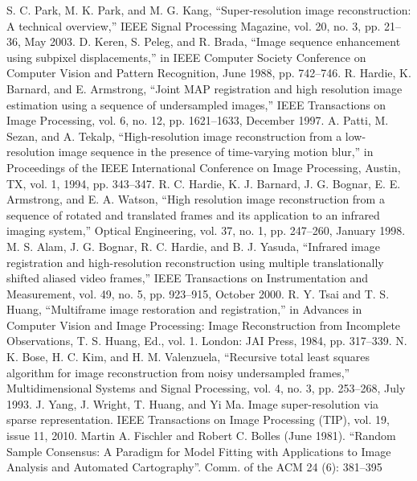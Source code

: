 
\begin{thebibliography}{99}

 S. C. Park, M. K. Park, and M. G. Kang, “Super-resolution image reconstruction:
A technical overview,” IEEE Signal Processing Magazine, vol. 20, no. 3, pp. 21–36,
May 2003.
 D. Keren, S. Peleg, and R. Brada, “Image sequence enhancement using subpixel
displacements,” in IEEE Computer Society Conference on Computer Vision and
Pattern Recognition, June 1988, pp. 742–746.
 R. Hardie, K. Barnard, and E. Armstrong, “Joint MAP registration and high resolution image estimation using a sequence of undersampled images,” IEEE Transactions on Image Processing, vol. 6, no. 12, pp. 1621–1633, December 1997.
 A. Patti, M. Sezan, and A. Tekalp, “High-resolution image reconstruction from
a low-resolution image sequence in the presence of time-varying motion blur,” in
Proceedings of the IEEE International Conference on Image Processing, Austin,
TX, vol. 1, 1994, pp. 343–347.
 R. C. Hardie, K. J. Barnard, J. G. Bognar, E. E. Armstrong, and E. A. Watson, “High resolution image reconstruction from a sequence of rotated and translated
frames and its application to an infrared imaging system,” Optical Engineering,
vol. 37, no. 1, pp. 247–260, January 1998.
 M. S. Alam, J. G. Bognar, R. C. Hardie, and B. J. Yasuda, “Infrared image registration and high-resolution reconstruction using multiple translationally shifted aliased video frames,” IEEE Transactions on Instrumentation and Measurement, vol. 49,
no. 5, pp. 923–915, October 2000.
 R. Y. Tsai and T. S. Huang, “Multiframe image restoration and registration,” in Advances in Computer Vision and Image Processing: Image Reconstruction from Incomplete Observations, T. S. Huang, Ed., vol. 1. London: JAI Press, 1984, pp. 317–339.
 N. K. Bose, H. C. Kim, and H. M. Valenzuela, “Recursive total least squares algorithm for image reconstruction from noisy undersampled frames,” Multidimensional Systems and Signal Processing, vol. 4, no. 3, pp. 253–268, July 1993.
 J. Yang, J. Wright, T. Huang, and Yi Ma. Image super-resolution via sparse representation. IEEE Transactions on Image Processing (TIP), vol. 19, issue 11, 2010.
 Martin A. Fischler and Robert C. Bolles (June 1981). “Random Sample Consensus: A Paradigm for Model Fitting with Applications to Image Analysis and Automated Cartography”. Comm. of the ACM 24 (6): 381–395

\end{thebibliography}
